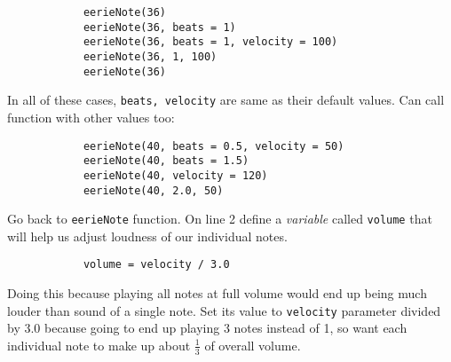 \documentclass{article}
\begin{document}
\begin{itemize}
\begin{itemize}
		\begin{verbatim}
			eerieNote(36)
			eerieNote(36, beats = 1)
			eerieNote(36, beats = 1, velocity = 100)
			eerieNote(36, 1, 100)
			eerieNote(36)
		\end{verbatim}
		In all of these cases, {\tt beats, velocity} are same as their default values. Can call function with other values too:
		\begin{verbatim}
			eerieNote(40, beats = 0.5, velocity = 50)
			eerieNote(40, beats = 1.5)
			eerieNote(40, velocity = 120)
			eerieNote(40, 2.0, 50)
		\end{verbatim}
		Go back to {\tt eerieNote} function. On line 2 define a {\it variable} called {\tt volume} that will help us adjust loudness of our individual notes.
		\begin{verbatim}
			volume = velocity / 3.0
		\end{verbatim}
		Doing this because playing all notes at full volume would end up being much louder than sound of a single note. Set its value to {\tt velocity} parameter divided by 3.0 because going to end up playing 3 notes instead of 1, so want each individual note to make up about $\frac{1}{3}$ of overall volume.
		

\end{itemize}
\end{itemize}
\end{document}
